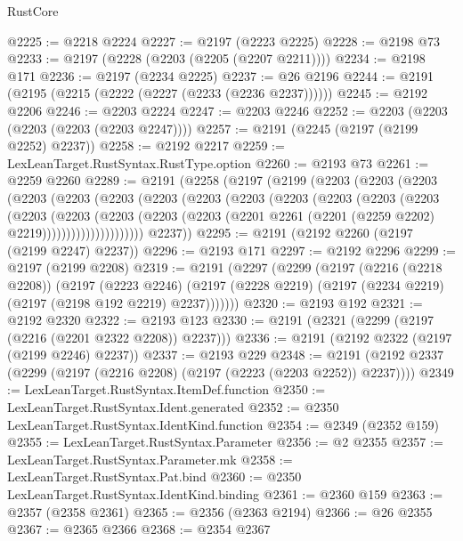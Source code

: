 \begin{lexlean}{RustCore}
\begin{coremodule}
@2225 := @2218 @2224
@2227 := @2197 (@2223 @2225)
@2228 := @2198 @73
@2233 := @2197 (@2228 (@2203 (@2205 (@2207 @2211))))
@2234 := @2198 @171
@2236 := @2197 (@2234 @2225)
@2237 := @26 @2196
@2244 := @2191 (@2195 (@2215 (@2222 (@2227 (@2233 (@2236 @2237))))))
@2245 := @2192 @2206
@2246 := @2203 @2224
@2247 := @2203 @2246
@2252 := @2203 (@2203 (@2203 (@2203 (@2203 @2247))))
@2257 := @2191 (@2245 (@2197 (@2199 @2252) @2237))
@2258 := @2192 @2217
@2259 := LexLeanTarget.RustSyntax.RustType.option
@2260 := @2193 @73
@2261 := @2259 @2260
@2289 := @2191
    (@2258
      (@2197
        (@2199
          (@2203
            (@2203
              (@2203
                (@2203
                  (@2203
                    (@2203
                      (@2203
                        (@2203
                          (@2203
                            (@2203
                              (@2203
                                (@2203
                                  (@2203
                                    (@2203
                                      (@2203
                                        (@2203
                                          (@2203
                                            (@2203
                                              (@2201
                                                @2261
                                                (@2201 (@2259 @2202) @2219)))))))))))))))))))))
        @2237))
@2295 := @2191 (@2192 @2260 (@2197 (@2199 @2247) @2237))
@2296 := @2193 @171
@2297 := @2192 @2296
@2299 := @2197 (@2199 @2208)
@2319 := @2191
    (@2297
      (@2299
        (@2197
          (@2216 (@2218 @2208))
          (@2197
            (@2223 @2246)
            (@2197 (@2228 @2219) (@2197 (@2234 @2219) (@2197 (@2198 @192 @2219) @2237)))))))
@2320 := @2193 @192
@2321 := @2192 @2320
@2322 := @2193 @123
@2330 := @2191 (@2321 (@2299 (@2197 (@2216 (@2201 @2322 @2208)) @2237)))
@2336 := @2191 (@2192 @2322 (@2197 (@2199 @2246) @2237))
@2337 := @2193 @229
@2348 := @2191 (@2192 @2337 (@2299 (@2197 (@2216 @2208) (@2197 (@2223 (@2203 @2252)) @2237))))
@2349 := LexLeanTarget.RustSyntax.ItemDef.function
@2350 := LexLeanTarget.RustSyntax.Ident.generated
@2352 := @2350 LexLeanTarget.RustSyntax.IdentKind.function
@2354 := @2349 (@2352 @159)
@2355 := LexLeanTarget.RustSyntax.Parameter
@2356 := @2 @2355
@2357 := LexLeanTarget.RustSyntax.Parameter.mk
@2358 := LexLeanTarget.RustSyntax.Pat.bind
@2360 := @2350 LexLeanTarget.RustSyntax.IdentKind.binding
@2361 := @2360 @159
@2363 := @2357 (@2358 @2361)
@2365 := @2356 (@2363 @2194)
@2366 := @26 @2355
@2367 := @2365 @2366
@2368 := @2354 @2367

\end{coremodule}
\end{lexlean}
